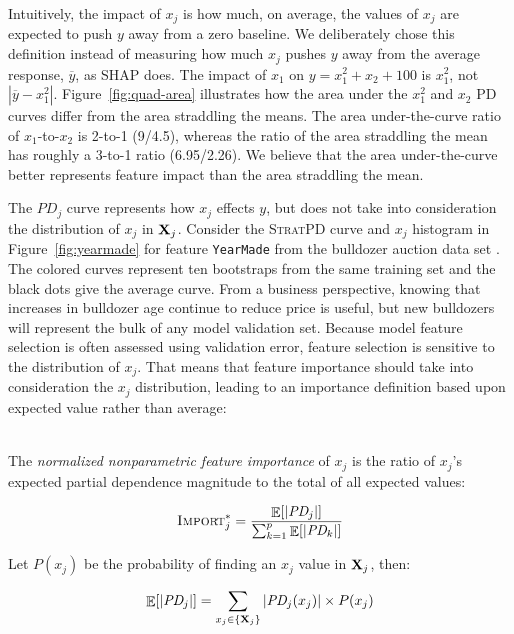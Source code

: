 \documentclass[11pt]{article}
\newcommand{\figref}[1]{Figure~\ref{#1}}
\DeclareMathOperator{\Ex}{\mathbb{E}}
\newcommand{\Impo}{\fontfamily{cmr}\textsc{Import}}
\newcommand{\spd}{\fontfamily{cmr}\textsc{\small StratPD}}
\begin{document}
Intuitively, the impact of $x_j$ is how much, on average, the values of $x_j$ are expected to push $y$ away from a zero baseline. We deliberately chose this  definition instead of measuring how much $x_j$ pushes $y$ away from the average response, $\overline{y}$, as SHAP does. The impact of $x_1$ on $y = x_1^2+x_2+100$ is $x_1^2$, not $|\overline{y} - x_1^2|$.  \figref{fig:quad-area} illustrates how the area under the $x_1^2$ and $x_2$ PD curves differ from the area straddling the means. The area under-the-curve ratio of $x_1$-to-$x_2$ is 2-to-1 (9/4.5), whereas the ratio of the area straddling the mean has roughly a 3-to-1 ratio (6.95/2.26). We believe that the area under-the-curve better represents feature impact than the area straddling the mean.

The $PD_j$ curve represents how $x_j$ effects $y$, but does not take into consideration the distribution of $x_j$ in ${\bf X}_j$.  Consider the \spd{} curve and $x_j$ histogram in \figref{fig:yearmade} for feature {\tt\small YearMade} from the bulldozer auction data set \citep{bulldozer}. The colored curves represent ten bootstraps from the same training set and the black dots give the average curve.   From a business perspective, knowing that increases in bulldozer age continue to reduce price is useful, but new bulldozers will represent the bulk of any model validation set.  Because model feature selection is often assessed using  validation error, feature selection is sensitive to the distribution of $x_j$. That means that feature importance should take into consideration the $x_j$ distribution, leading to an importance definition based upon expected value rather than average:

~\\
 The {\em normalized nonparametric feature importance} of $x_j$ is the ratio of $x_j$'s expected partial dependence magnitude to the total of all expected values:

\begin{equation}\label{eq:Epd3b}
\Impo_j^{*} = \frac{\Ex[|\text{\it PD}_j|]}{\sum_{k=1}^p \Ex[|\text{\it PD}_k|]}
\end{equation}

\noindent Let $P(x_j)$ be the probability of finding an $x_j$ value in ${\bf X}_j$, then:


\begin{equation}\label{eq:Epd3c}
\Ex[|\text{\it PD}_j|] = \sum_{x_j \in \{{\bf X}_j\}} |\text{\it PD}_j(x_j)| \times P(x_j)
\end{equation}
\end{document}

